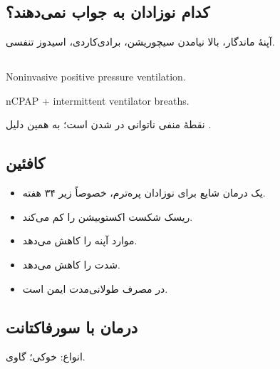 \documentclass[12pt,a4paper]{article}
\begin{document}
\subsection*{کدام نوزادان به  جواب نمی‌دهند؟}
آپنهٔ ماندگار، بالا نیامدن سیچوریشن، برادی‌کاردی، اسیدوز تنفسی.
\subsection*{}
\begin{latin}
Noninvasive positive pressure ventilation.
\par nCPAP + intermittent ventilator breaths.
\end{latin}
نقطهٔ منفی  ناتوانی در  شدن است؛ به همین دلیل .
\subsection*{کافئین}
\begin{itemize}
\item یک درمان شایع برای نوزادان پره‌ترم، خصوصاً زیر ۳۴ هفته.
\item ریسک شکست اکستوبیشن را کم می‌کند.
\item موارد آپنه را کاهش می‌دهد.
\item شدت  را کاهش می‌دهد.
\item در مصرف طولانی‌مدت ایمن است.
\end{itemize}

\subsection*{درمان با سورفاکتانت}
انواع: خوکی؛ گاوی.
\end{document}
